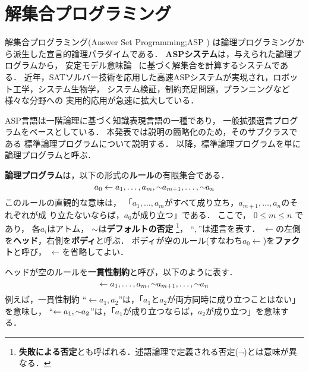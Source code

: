 \section{解集合プログラミング}\label{sec:asp}

解集合プログラミング(Answer Set Programming;ASP \cite{%
  Baral03:cambridge,%
  Gelfond88:iclp,%
  Inoue08:jssst})
は論理プログラミングから派生した宣言的論理パラダイムである．
\textbf{ASPシステム}は，与えられた論理プログラムから，
安定モデル意味論~\cite{Gelfond88:iclp}
に基づく解集合を計算するシステムである．
近年，SATソルバー技術を応用した高速ASPシステムが実現され，ロボット工学，システム生物学，
システム検証，制約充足問題，プランニングなど様々な分野への
実用的応用が急速に拡大している\cite{Gelfond16:aim}．

ASP言語は一階論理に基づく知識表現言語の一種であり，
一般拡張選言プログラムをベースとしている． 
本発表では説明の簡略化のため，そのサブクラスである
標準論理プログラムについて説明する．
以降，標準論理プログラムを単に論理プログラムと呼ぶ．

\textbf{論理プログラム}は，以下の形式の\textbf{ルール}の有限集合である．
\begin{equation}
  \label{eq:rule}
  a_0\leftarrow a_1,\dots,a_m,{\sim\!\!{a_{m+1}}},\dots,{\sim\!\!{a_n}}
\end{equation}
このルールの直観的な意味は，
「$a_1,\ldots,a_m$がすべて成り立ち，$a_{m+1},\ldots,a_n$のそれぞれが成
り立たないならば，$a_0$が成り立つ」である．
ここで，
$0\leq m\leq n$ であり，
各$a_i$はアトム，
${\sim\!\!{}}$は\textbf{デフォルトの否定}
\footnote{\textbf{失敗による否定}とも呼ばれる．述語論理で定義される否定($\neg$)とは意味が異なる．}，
``$,$''は連言を表す．
$\leftarrow$の左側を\textbf{ヘッド}，右側を\textbf{ボディ}と呼ぶ．
ボディが空のルール(すなわち\(a_0\leftarrow\))を\textbf{ファクト}と呼び，
$\leftarrow$を省略してよい．

ヘッドが空のルールを\textbf{一貫性制約}と呼び，以下のように表す．
\begin{equation}
  \label{eq:constr}
  \leftarrow a_1,\dots,a_m,{\sim\!\!{a_{m+1}}},\dots,{\sim\!\!{a_n}}
\end{equation}
例えば，一貫性制約
``\(\leftarrow a_1,a_2\)''は，「$a_1$と$a_2$が両方同時に成り立つことはない」を意味し，
``\(\leftarrow a_1, {\sim\!\!{a_{2}}}\)''は，「$a_1$が成り立つならば，$a_2$が成り立つ」を意味する．



